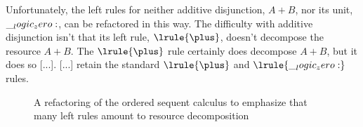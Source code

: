 Unfortunately, the left rules for neither additive disjunction, $A \plus B$,%
nor its unit, $\__logic_zero:$, can be refactored in this way.
The difficulty with additive disjunction isn't that its left rule, $\lrule{\plus}$, doesn't decompose the resource $A \plus B$.
The $\lrule{\plus}$ rule certainly does decompose $A \plus B$, but it does so [...].
[...] retain the standard $\lrule{\plus}$ and $\lrule{\zero}$ rules.

\begin{figure}[tbp]
  \caption{A refactoring of the ordered sequent calculus to emphasize that many left rules amount to resource decomposition}\label{fig:ordered-rewriting:decompose-seq-calc}
\end{figure}

